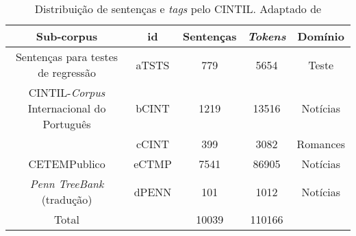 \begin{table}[!ht]
    \centering
    \begin{tabular}{|c|c|c|c|c|}
    \hline
        Sub-corpus & id & Sentenças & \textit{Tokens} & Domínio\\
    \hline
        Sentenças para testes de regressão & aTSTS & 779 & 5654 & Teste\\
        \hline
        CINTIL-\textit{Corpus} Internacional do Português & bCINT & 1219 & 13516 & Notícias\\
         & cCINT & 399 & 3082 & Romances\\
         \hline
        CETEMPublico & eCTMP & 7541 & 86905 & Notícias\\
        \hline
        \textit{Penn TreeBank} (tradução) & dPENN & 101 & 1012 & Notícias\\
        \hline
        Total &  & 10039 & 110166 & \\
    \hline
    
    \end{tabular}
    \caption[Distribuição de sentenças e \textit{tags} pelo CINTIL]{Distribuição de sentenças e \textit{tags} pelo CINTIL. Adaptado de \cite[p~1]{narrativeDescriptionCintil}}
    \label{tab:cintil_tags}
\end{table}